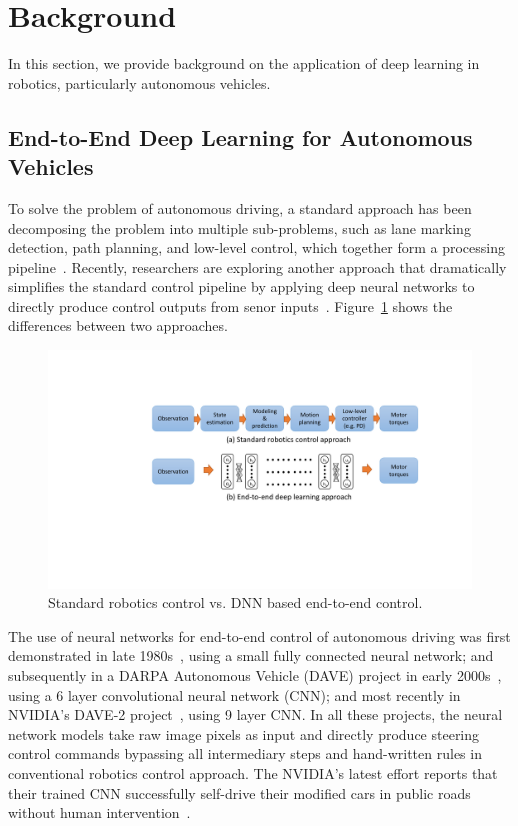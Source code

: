 \section{Background} \label{sec:background}

In this section, we provide background on the application of deep
learning in robotics, particularly autonomous vehicles.

\subsection{End-to-End Deep Learning for Autonomous Vehicles}


To solve the problem of autonomous driving, a standard approach has
been decomposing the problem into multiple sub-problems,
such as lane marking detection, path planning, and low-level
control, which together form a processing pipeline~\cite{Bojarski2016}.
Recently, researchers are exploring another approach that dramatically
simplifies the standard control pipeline by applying deep neural
networks to directly produce control outputs from senor
inputs~\cite{Levine2016}. Figure~\ref{fig:end-to-end-control}
shows the differences between two approaches.

\begin{figure}[h]
  \centering
  \includegraphics[width=.5\textwidth]{figs/endtoend_redrawn}
  \caption{Standard robotics control vs. DNN based end-to-end
    control. }
  \label{fig:end-to-end-control}
\end{figure}

The use of neural networks for end-to-end control of autonomous
driving was first demonstrated in late 1980s~\cite{Pomerleau1989},
using a small fully connected neural network; and subsequently in a
DARPA Autonomous Vehicle (DAVE) project in early
2000s~\cite{LeCun:04}, using a 6 layer convolutional neural network
(CNN); and most recently in NVIDIA's DAVE-2
project~\cite{Bojarski2016}, using 9 layer CNN. In all these projects,
the neural network models take raw image pixels as input and directly
produce steering control commands bypassing all intermediary steps and
hand-written rules in conventional robotics control approach. The
NVIDIA's latest effort reports that their trained CNN successfully
self-drive their modified cars in public roads without human
intervention~\cite{Bojarski2016}. 

